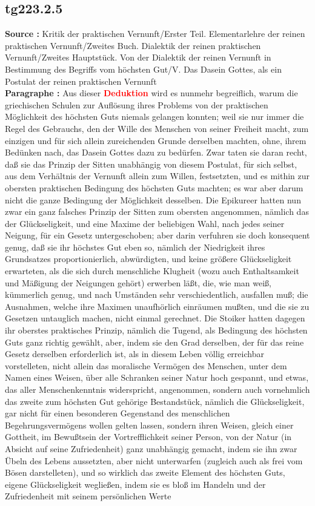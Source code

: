 \documentclass[a4paper,12pt,twoside]{book}
\newcommand{\match}[1]{\textcolor{red}{\textbf{#1}}}
\begin{document}
	\subsection*{tg223.2.5} 
	\textbf{Source : }Kritik der praktischen Vernunft/Erster Teil. Elementarlehre der reinen praktischen Vernunft/Zweites Buch. Dialektik der reinen praktischen Vernunft/Zweites Hauptstück. Von der Dialektik der reinen Vernunft in Bestimmung des Begriffs vom höchsten Gut/V. Das Dasein Gottes, als ein Postulat der reinen praktischen Vernunft\\  
	
	\noindent\textbf{Paragraphe : }Aus dieser \match{Deduktion} wird es nunmehr begreiflich, warum die griechischen Schulen zur Auflösung ihres Problems von der praktischen Möglichkeit des höchsten Guts niemals gelangen konnten; weil sie nur immer die Regel des Gebrauchs, den der Wille des Menschen von seiner Freiheit macht, zum einzigen und für sich allein zureichenden Grunde derselben machten, ohne, ihrem Bedünken nach, das Dasein Gottes dazu zu bedürfen. Zwar taten sie daran recht, daß sie das Prinzip der Sitten unabhängig von diesem Postulat, für sich selbst, aus dem Verhältnis der Vernunft allein zum Willen, festsetzten, und es mithin zur obersten praktischen Bedingung des höchsten Guts machten; es war aber darum nicht die ganze Bedingung der Möglichkeit desselben. Die Epikureer hatten nun zwar ein ganz falsches Prinzip der Sitten zum obersten angenommen, nämlich das der Glückseligkeit, und eine Maxime der beliebigen Wahl, nach jedes seiner Neigung, für ein Gesetz untergeschoben; aber darin verfuhren sie doch konsequent genug, daß sie ihr höchstes Gut eben so, nämlich der Niedrigkeit ihres Grundsatzes proportionierlich, abwürdigten, und keine größere Glückseligkeit erwarteten, als die sich durch menschliche Klugheit (wozu auch Enthaltsamkeit und Mäßigung der Neigungen gehört) erwerben läßt, die, wie man weiß, kümmerlich genug, und nach Umständen sehr verschiedentlich, ausfallen muß; die Ausnahmen, welche ihre  Maximen unaufhörlich einräumen mußten, und die sie zu Gesetzen untauglich machen, nicht einmal gerechnet. Die Stoiker hatten dagegen ihr oberstes praktisches Prinzip, nämlich die Tugend, als Bedingung des höchsten Guts ganz richtig gewählt, aber, indem sie den Grad derselben, der für das reine Gesetz derselben erforderlich ist, als in diesem Leben völlig erreichbar vorstelleten, nicht allein das moralische Vermögen des Menschen, unter dem Namen eines Weisen, über alle Schranken seiner Natur hoch gespannt, und etwas, das aller Menschenkenntnis widerspricht, angenommen, sondern auch vornehmlich das zweite zum höchsten Gut gehörige Bestandstück, nämlich die Glückseligkeit, gar nicht für einen besonderen Gegenstand des menschlichen Begehrungsvermögens wollen gelten lassen, sondern ihren Weisen, gleich einer Gottheit, im Bewußtsein der Vortrefflichkeit seiner Person, von der Natur (in Absicht auf seine Zufriedenheit) ganz unabhängig gemacht, indem sie ihn zwar Übeln des Lebens aussetzten, aber nicht unterwarfen (zugleich auch als frei vom Bösen darstelleten), und so wirklich das zweite Element des höchsten Guts, eigene Glückseligkeit wegließen, indem sie es bloß im Handeln und der Zufriedenheit mit seinem persönlichen Werte 
\end{document}

